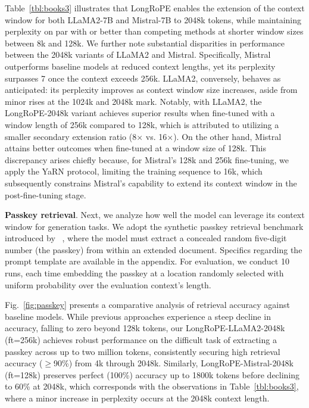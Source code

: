 Table~\ref{tbl:books3} illustrates that LongRoPE enables the extension of the context window for both LLaMA2-7B and Mistral-7B to 2048k tokens, while maintaining perplexity on par with or better than competing methods at shorter window sizes between 8k and 128k. We further note substantial disparities in performance between the 2048k variants of LLaMA2 and Mistral. Specifically, Mistral outperforms baseline models at reduced context lengths, yet its perplexity surpasses 7 once the context exceeds 256k. LLaMA2, conversely, behaves as anticipated: its perplexity improves as context window size increases, aside from minor rises at the 1024k and 2048k mark. Notably, with LLaMA2, the LongRoPE-2048k variant achieves superior results when fine-tuned with a window length of 256k compared to 128k, which is attributed to utilizing a smaller secondary extension ratio (8$\times$ vs. 16$\times$). On the other hand, Mistral attains better outcomes when fine-tuned at a window size of 128k. This discrepancy arises chiefly because, for Mistral’s 128k and 256k fine-tuning, we apply the YaRN protocol, limiting the training sequence to 16k, which subsequently constrains Mistral’s capability to extend its context window in the post-fine-tuning stage.

\textbf{Passkey retrieval}. Next, we analyze how well the model can leverage its context window for generation tasks. We adopt the synthetic passkey retrieval benchmark introduced by ~\cite{passkey}, where the model must extract a concealed random five-digit number (the passkey) from within an extended document. Specifics regarding the prompt template are available in the appendix. For evaluation, we conduct 10 runs, each time embedding the passkey at a location randomly selected with uniform probability over the evaluation context's length.

Fig.~\ref{fig:passkey} presents a comparative analysis of retrieval accuracy against baseline models. While previous approaches experience a steep decline in accuracy, falling to zero beyond 128k tokens, our LongRoPE-LLaMA2-2048k (ft=256k) achieves robust performance on the difficult task of extracting a passkey across up to two million tokens, consistently securing high retrieval accuracy ($\ge$90\%) from 4k through 2048k. Similarly, LongRoPE-Mistral-2048k (ft=128k) preserves perfect (100\%) accuracy up to 1800k tokens before declining to 60\% at 2048k, which corresponds with the observations in Table~\ref{tbl:books3}, where a minor increase in perplexity occurs at the 2048k context length.

